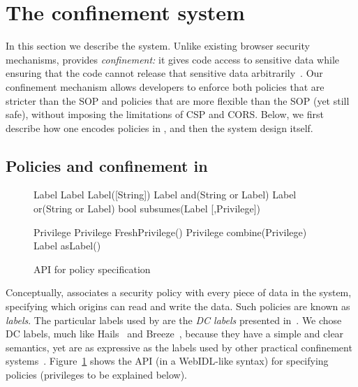 \section{The \sys{} confinement system}
\label{sec:system}

In this section we describe the \sys{} system.
%
Unlike existing browser security mechanisms, \sys{} provides
\emph{confinement:} it gives code access to sensitive
data while ensuring that the code cannot release that sensitive
data arbitrarily~\cite{SaltzerS75}.
%
Our confinement mechanism allows developers to enforce both policies
that are stricter than the SOP and policies that are more flexible
than the SOP (yet still safe), without imposing the limitations of CSP
and CORS.
%
Below, we first describe how one encodes policies in \sys{}, and then
the system design itself.

\subsection{Policies and confinement in \sys{}}
\label{sec:system:policy}

\begin{figure}
{\small{
\begin{webidl}
Label {
  Label Label([String])
  Label and(String or Label)
  Label or(String or Label)
  bool subsumes(Label [,Privilege])
}
\end{webidl}
\begin{webidl}
Privilege {
  Privilege FreshPrivilege()
  Privilege combine(Privilege)
  Label asLabel()
}
\end{webidl}
}}
\vspace{-10pt}
\caption{\label{fig:APIspec} API for policy specification}
\vspace{-10pt}
\end{figure}


Conceptually, \sys{} associates a security policy with every piece of
data in the system, specifying which origins can read and write the
data.
%
Such policies are known as \emph{labels}.
%
The particular labels used by \sys{} are the \emph{DC
labels} presented in~\cite{stefan:2011:dclabels}.
%
We chose DC labels, much like Hails~\cite{giffin:2012:hails} and
Breeze~\cite{Breeze13}, because they have a simple and clear
semantics, yet are as expressive as the labels used by other practical
confinement systems~\cite{GenLabels}. Figure~\ref{fig:APIspec} shows
the \sys{} API (in a WebIDL-like syntax) for specifying policies
(privileges to be explained below).


